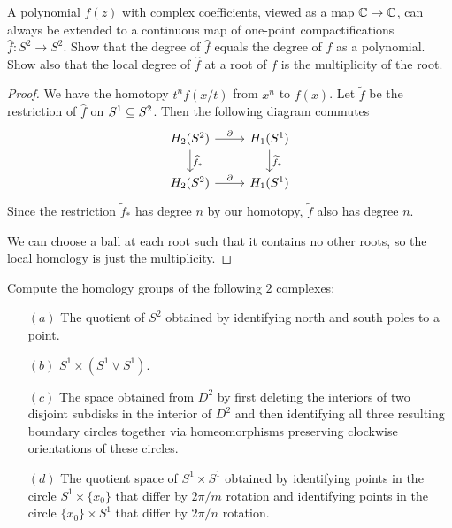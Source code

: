 \begin{exercise}
A polynomial $f(z)$ with complex coefficients, viewed as a map $\mathbb{C}\to \mathbb{C}$, can always be extended to a continuous map of one-point compactifications $\widehat{f}:S^2\to S^2$. Show
that the degree of $\widehat{f}$ equals the degree of $f$ as a polynomial. Show also that the local degree of $\widehat{f}$ at a root of $f$ is the multiplicity of the root.
\end{exercise}
\begin{proof}
We have the homotopy $t^nf(x/t)$ from $x^n$ to $f(x)$. Let $\widetilde{f}$ be the restriction of $\widehat{f}$ on $S^1\subseteq S^2$. Then the following diagram commutes
\[\begin{tikzcd}
H_2(S^2)\ar[r,"\partial"]\ar[d,"\widehat{f}_*"]&H_1(S^1)\ar[d,"\widetilde{f}_*"]\\
H_2(S^2)\ar[r,"\partial"]&H_1(S^1)
\end{tikzcd}\]
Since the restriction $\widetilde{f}_*$ has degree $n$ by our homotopy, $\widetilde{f}$ also has degree $n$.\par
We can choose a ball at each root such that it contains no other roots, so the local homology is just the multiplicity. 
\end{proof}
\begin{exercise}
Compute the homology groups of the following $2$ complexes:
\begin{itemize}
\item[$(a)$]The quotient of $S^2$ obtained by identifying north and south poles to a point.
\item[$(b)$]$S^1\times(S^1\vee S^1)$.
\item[$(c)$]The space obtained from $D^2$ by first deleting the interiors of two disjoint subdisks in the interior of $D^2$ and then identifying all three resulting boundary circles together via homeomorphisms preserving clockwise orientations of these circles.
\item[$(d)$]The quotient space of $S^1\times S^1$ obtained by identifying points in the circle $S^1\times\{x_0\}$ that differ by $2\pi/m$ rotation and identifying points in the circle $\{x_0\}\times S^1$ that differ by $2\pi/n$ rotation.
\end{itemize}
\end{exercise}
